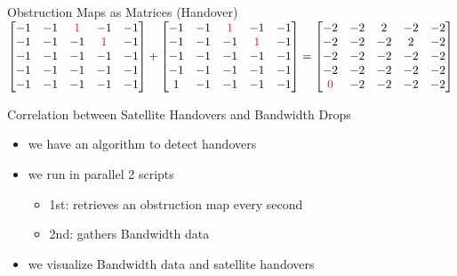 \documentclass[NET,english,beameralt]{tumbeamer}
\begin{document}
\begin{frame}{Obstruction Maps as Matrices (Handover)}
    $\begin{bmatrix}
        -1 & -1 & \color{red}1 &           -1 & -1 \\
        -1 & -1 &           -1 & \color{red}1 & -1 \\
        -1 & -1 &           -1 &           -1 & -1 \\
        -1 & -1 &           -1 &           -1 & -1 \\
        -1 & -1 &           -1 &           -1 & -1 \\
    \end{bmatrix}
    +
    \begin{bmatrix}
        -1 & -1 & \color{red}1 &           -1 & -1 \\
        -1 & -1 &           -1 & \color{red}1 & -1 \\
        -1 & -1 &           -1 &           -1 & -1 \\
        -1 & -1 &           -1 &           -1 & -1 \\
        1 & -1 &            -1 &           -1 & -1 \\
    \end{bmatrix}
    =
    \begin{bmatrix}
        -2 & -2 & 2 & -2 & -2 \\
        -2 & -2 & -2 & 2 & -2 \\
        -2 & -2 & -2 & -2 & -2 \\
        -2 & -2 & -2 & -2 & -2 \\
        \color{red}0 & -2 & -2 & -2 & -2 \\
    \end{bmatrix}$
\end{frame}

\begin{frame}[fragile]{Correlation between Satellite Handovers and Bandwidth Drops}
    \begin{itemize}
        \item we have an algorithm to detect handovers
        \item we run in parallel 2 scripts
            \begin{itemize}
                \item 1st: retrieves an obstruction map every second
                \item 2nd: gathers Bandwidth data
            \end{itemize} 
        \item we visualize Bandwidth data and satellite handovers 
    \end{itemize}
\end{frame}
\end{document}
